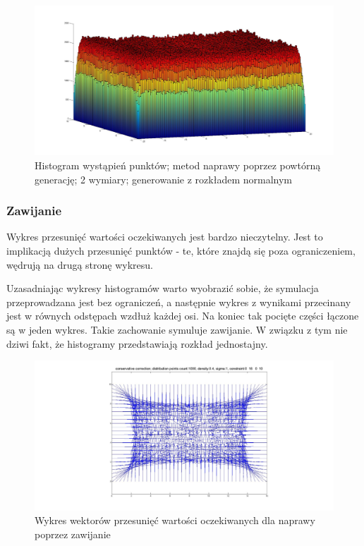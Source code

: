 \documentclass{mini}
\begin{document}
\begin{figure}[H]
\centering
\includegraphics[width=\textwidth]{s_n_10M_2__20_20__10_10_4_2}
\caption{Histogram wystąpień punktów; metod naprawy poprzez powtórną generację; 2 wymiary; generowanie z rozkładem normalnym}
\end{figure}

\subsubsection*{Zawijanie}
\hspace{3,4ex}Wykres przesunięć wartości oczekiwanych jest bardzo nieczytelny. Jest to implikacją dużych przesunięć punktów - te, które znajdą się poza ograniczeniem, wędrują na drugą stronę wykresu.

Uzasadniając wykresy histogramów warto wyobrazić sobie, że symulacja przeprowadzana jest bez ograniczeń, a następnie wykres z wynikami przecinany jest w równych odstępach wzdłuż każdej osi. Na koniec tak pocięte części łączone są w jeden wykres. Takie zachowanie symuluje zawijanie. W związku z tym nie dziwi fakt, że histogramy przedstawiają rozkład jednostajny.

\begin{figure}[H]
\centering
\includegraphics[width=\textwidth]{wrapping2dprzesuniecie}
\caption{Wykres wektorów przesunięć wartości oczekiwanych dla naprawy poprzez zawijanie}
\end{figure}
\end{document}
